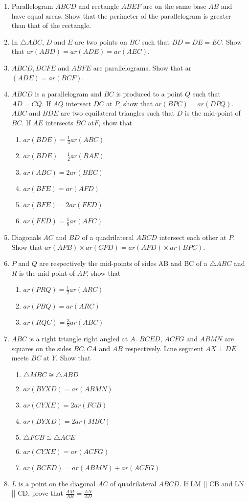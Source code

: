 \begin{enumerate}[label=\arabic*.,ref=\thesubsection.\theenumi]
\item Parallelogram $ABCD$ and rectangle $ABEF$ are on the same base $AB$ and have equal areas. Show that the perimeter of the parallelogram is greater than that of the rectangle.
\item  In $\triangle ABC$,  $D$ and $E$ are two points on $BC$ such that $BD = DE = EC$. Show that $ar (ABD) = ar (ADE) = ar (AEC)$.
\item $ABCD, DCFE$ and $ABFE$ are parallelograms. Show that ar$ (ADE) = ar (BCF)$.
\item  $ABCD$ is a parallelogram and $BC$ is produced to a point $Q$ such that $AD = CQ$. If $AQ$ intersect $DC$ at $P$, show that $ar (BPC) = ar (DPQ)$.
$ABC$ and $BDE$ are two equilateral triangles such that $D$ is the mid-point of $BC$. If $AE$ intersects $BC$ at$ F$, show that 
\begin{enumerate}
\item $ar (BDE) = \frac{1}{ 4} ar (ABC)$
\item $ar (BDE) = \frac{1}{ 2} ar (BAE)$
\item $ar (ABC) = 2 ar (BEC)$
 \item $ar (BFE) = ar (AFD)$ 
\item $ar (BFE) = 2 ar (FED)$
\item $ar (FED) =
\frac{1}{ 8}
ar (AFC)$
\end{enumerate}
\item Diagonals $AC$ and $BD$ of a quadrilateral $ABCD$ intersect each other at $P$. Show that $ar (APB)  \times  ar (CPD) = ar (APD)  \times  ar (BPC)$.
\item  $P$ and $Q$ are respectively the mid-points of sides AB and BC of a $\triangle ABC$ and $R$ is the mid-point of $AP$, show that 
\begin{enumerate}
\item $ar (PRQ) = \frac{1 }{2}ar (ARC) $
\item $ar (PBQ) = ar (ARC)$
\item $ar (RQC) =
\frac{3}{ 8}
ar (ABC)$
\end{enumerate}
%
\item $ABC$ is a right triangle right angled at $A$. $BCED$, $ACFG$ and $ABMN$ are
squares on the sides $BC, CA$ and $AB$ respectively. Line segment $AX \perp  DE$ meets $BC$ at $Y$. Show that 
\begin{enumerate}
\item $ \triangle  MBC \cong  \triangle  ABD$
\item $ar (BYXD) = ar (ABMN)$ \item $ar (CYXE) = 2 ar (FCB)$
\item $ar (BYXD) = 2 ar (MBC)$ 
\item $ \triangle  FCB \cong  \triangle  ACE$
\item $ar (CYXE) = ar (ACFG)$
\item  $ar (BCED) = ar (ABMN) + ar (ACFG)$
\end{enumerate}
\item $L$ is a point on the diagonal $AC$ of quadrilateral $ABCD$.  If LM || CB and LN || CD, prove that $\frac{AM}{AB}=\frac{ AN}{  AD}$

\end{enumerate}
